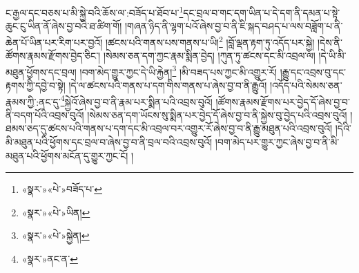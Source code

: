 ང་རྒྱལ་དང་བཅས་པ་མི་སྐྱེ་བའི་ཆོས་ལ་:བཟོད་པ་ཐོབ་པ་\footnote{«སྣར་»«པེ་»བཟོད་པ་}དང་བྲལ་བ་གང་དག་ཡིན་པ་དེ་དག་ནི་དམན་པ་སྟེ་ཆུང་ངུ་ཡིན་ནོ་ཞེས་བྱ་བའི་ཐ་ཚིག་གོ། །གཞན་ཉིད་ནི་ལྷག་པའོ་ཞེས་བྱ་བ་ནི་ཇི་སྐད་བཤད་པ་ལས་བཟློག་པ་ནི་ཆེན་པོ་ཡིན་པར་རིག་པར་བྱའོ། །ཚངས་པའི་གནས་པས་གནས་པ་ཡི།\footnote{«སྣར་»«པེ་»ཡིན།} །བློ་ལྡན་རྟག་ཏུ་འདོད་པར་སྐྱེ། །དེས་ནི་ཚོགས་རྣམས་རྫོགས་བྱེད་ཅིང་། །སེམས་ཅན་དག་ཀྱང་རྣམ་སྨིན་བྱེད། །ཀུན་ཏུ་ཚངས་དང་མི་འབྲལ་ལ། །དེ་ཡི་མི་མཐུན་ཕྱོགས་དང་བྲལ། །བག་མེད་གྱུར་ཀྱང་དེ་ཡི་རྐྱེན།\footnote{«སྣར་»«པེ་»སྐྱེན།} །མི་བཟད་པས་ཀྱང་མི་འགྱུར་རོ། །རྒྱུ་དང་འབྲས་བུ་དང་རྟགས་ཀྱི་དབྱེ་བ་སྟེ། །དེ་ལ་ཚངས་པའི་གནས་པ་དག་གིས་གནས་པ་ཞེས་བྱ་བ་ནི་རྒྱུའོ། །འདོད་པའི་སེམས་ཅན་རྣམས་ཀྱི་:ནང་དུ་\footnote{«སྣར་»ནང་ན་}སྐྱེའོ་ཞེས་བྱ་བ་ནི་རྣམ་པར་སྨིན་པའི་འབྲས་བུའོ། །ཚོགས་རྣམས་རྫོགས་པར་བྱེད་དོ་ཞེས་བྱ་བ་ནི་བདག་པོའི་འབྲས་བུའོ། །སེམས་ཅན་དག་ཡོངས་སུ་སྨིན་པར་བྱེད་དོ་ཞེས་བྱ་བ་ནི་སྐྱེས་བུ་བྱེད་པའི་འབྲས་བུའོ། །ཐམས་ཅད་དུ་ཚངས་པའི་གནས་པ་དག་དང་མི་འབྲལ་བར་འགྱུར་རོ་ཞེས་བྱ་བ་ནི་རྒྱུ་མཐུན་པའི་འབྲས་བུའོ། །དེའི་མི་མཐུན་པའི་ཕྱོགས་དང་བྲལ་བ་ཞེས་བྱ་བ་ནི་བྲལ་བའི་འབྲས་བུའོ། །བག་མེད་པར་གྱུར་ཀྱང་ཞེས་བྱ་བ་ནི་མི་མཐུན་པའི་ཕྱོགས་མངོན་དུ་གྱུར་ཀྱང་ངོ། །
